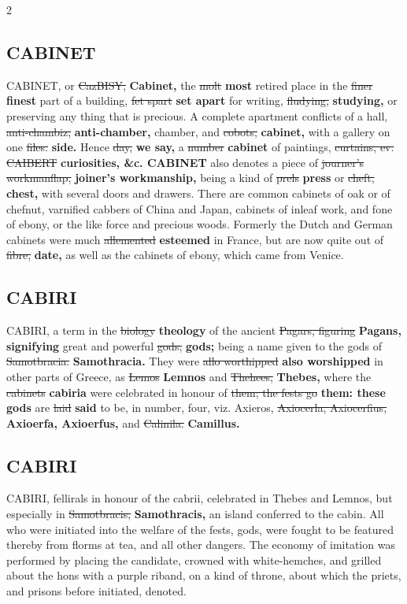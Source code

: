 \documentclass[10pt]{article}
\begin{document}
\begin{multicols}{2}
\subsection*{CABINET}
CABINET, or \sout{CazBISY,} \textbf{Cabinet,} the \sout{molt} \textbf{most} retired place in the \sout{finer} \textbf{finest} part of a building, \sout{fet spart} \textbf{set apart} for writing, \sout{fludying,} \textbf{studying,} or preserving any thing that is precious. A complete apartment conflicts of a hall, \sout{anti-chambiz,} \textbf{anti-chamber,} chamber, and \sout{cobots,} \textbf{cabinet,} with a gallery on one \sout{files.} \textbf{side.} Hence \sout{day,} \textbf{we say,} a \sout{number} \textbf{cabinet} of paintings, \sout{curtains, ev. CAIBERT} \textbf{curiosities, \&c. CABINET} also denotes a piece of \sout{journer's workmanflap,} \textbf{joiner's workmanship,} being a kind of \sout{prels} \textbf{press} or \sout{cheft,} \textbf{chest,} with several doors and drawers. There are common cabinets of oak or of chefnut, varnified cabbers of China and Japan, cabinets of inleaf work, and fone of ebony, or the like force and precious woods. Formerly the Dutch and German cabinets were much \sout{allemented} \textbf{esteemed} in France, but are now quite out of \sout{fibre,} \textbf{date,} as well as the cabinets of ebony, which came from Venice.

\subsection*{CABIRI}
CABIRI, a term in the \sout{biology} \textbf{theology} of the ancient \sout{Pagars, figuring} \textbf{Pagans, signifying} great and powerful \sout{gods,} \textbf{gods;} being a name given to the gods of \sout{Samotbracia.} \textbf{Samothracia.} They were \sout{allo worthipped} \textbf{also worshipped} in other parts of Greece, as \sout{Lemos} \textbf{Lemnos} and \sout{Thehees,} \textbf{Thebes,} where the \sout{cabinets} \textbf{cabiria} were celebrated in honour of \sout{them; the fests go} \textbf{them: these gods} are \sout{laid} \textbf{said} to be, in number, four, viz. Axieros, \sout{Axiocerla, Axiocerfius,} \textbf{Axioerfa, Axioerfus,} and \sout{Calinila.} \textbf{Camillus.}

\subsection*{CABIRI}
CABIRI, fellirals in honour of the cabrii, celebrated in Thebes and Lemnos, but especially in \sout{Samotbracis,} \textbf{Samothracis,} an island conferred to the cabin. All who were initiated into the welfare of the fests, gods, were fought to be featured thereby from florms at tea, and all other dangers. The economy of imitation was performed by placing the candidate, crowned with white-hemches, and grilled about the hons with a purple riband, on a kind of throne, about which the priets, and prisons before initiated, denoted.


\end{multicols}
\end{document}
